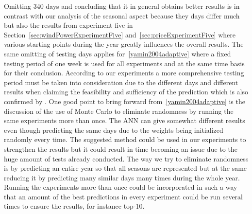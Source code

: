 Omitting 340 days and concluding that it in general obtains better results is in contrast with our analysis of the seasonal aspect because they days differ much but also the results from experiment five in Section~\ref{sec:windPowerExperimentFive} and~\ref{sec:priceExperimentFive} where various starting points during the year greatly influences the overall results. The same omitting of testing days applies for~\ref{yamin2004adaptive} where a fixed testing period of one week is used for all experiments and at the same time basis for their conclusion. According to our experiments a more comprehensive testing period must be taken into consideration due to the different days and different results when claiming the feasibility and sufficiency of the prediction which is also confirmed by \cite{forecastingSpotPricesAccountingForWindPower}. One good point to bring forward from~\ref{yamin2004adaptive} is the discussion of the use of Monte Carlo to eliminate randomness by running the same experiments more than once. The ANN can give somewhat different results even though predicting the same days due to the weights being initialized randomly every time. The suggested method could be used in our experiments to strengthen the results but it could result in time becoming an issue due to the huge amount of tests already conducted. The way we try to eliminate randomness is by predicting an entire year so that all seasons are represented but at the same reducing it by predicting many similar days many times during the whole year. Running the experiments more than once could be incorporated in such a way that an amount of the best predictions in every experiment could be run several times to ensure the results, for instance top-10. 